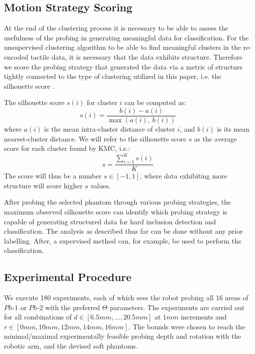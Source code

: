 \color{red}
\subsection{Motion Strategy Scoring} \label{sec_sil_coeff}
At the end of the clustering process it is necessary to be able to assess the usefulness of the probing in generating meaningful data for classification. For the unsupervised clustering algorithm to be able to find meaningful clusters in the re-encoded tactile data, it is necessary that the data exhibits structure. Therefore we score the probing strategy that generated the data via a metric of structure tightly connected to the type of clustering utilized in this paper, i.e. the silhouette score \cite{rousseeuw1987silhouettes}. 

The silhouette score $s(i)$ for cluster $i$ can be computed as:
\begin{equation}
s(i) = \frac{b(i)-a(i)}{\operatorname{max} (a(i),\ b(i))}
\end{equation}
where $a(i)$ is the mean intra-cluster distance of cluster $i$, and $b(i)$ is its mean nearest-cluster distance. 
We will refer to the silhouette score $s$ as the average score for each cluster found by KMC, i.e.: 
\begin{equation}
s = \frac{\sum_{i=1}^{K} s(i)}{K}
\end{equation}
The score will thus be a number $s \in [-1,1]$, where data exhibiting more structure will score higher $s$ values. 

After probing the selected phantom through various probing strategies, the maximum observed silhouette score can identify which probing strategy is capable of generating structured data for hard inclusion detection and classification. The analysis as described thus far can be done without any prior labelling. After, a supervised method can, for example, be used to perform the classification. 


\color{black}
\subsection{Experimental Procedure} \label{sec_overall_approach}
We execute 180 experiments, each of which sees the robot probing all 16 areas of $Ph\text{-}1$ or $Ph\text{-}2$ with the 
preferred $\Theta$ parameters. The experiments are carried out for all combinations of $d\in[6.5mm, ... , 20.5mm]$ at $1mm$
increments and $r\in[0mm, 10mm, 12mm, 14mm, 16mm]$. The bounds were chosen to reach the minimal/maximal experimentally 
feasible probing depth and rotation with the robotic arm, and the devised soft phantoms. 

